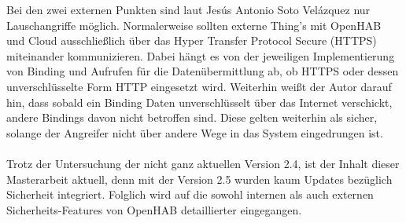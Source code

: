 Bei den zwei externen Punkten sind laut 
Jesús Antonio Soto Velázquez nur Lauschangriffe möglich. Normalerweise sollten externe Thing's mit OpenHAB und Cloud ausschließlich über das Hyper Transfer Protocol Secure (HTTPS) miteinander kommunizieren. Dabei hängt es von der jeweiligen Implementierung von Binding und Aufrufen für die Datenübermittlung ab, ob HTTPS oder dessen unverschlüsselte Form HTTP eingesetzt wird. Weiterhin weißt der Autor darauf hin, dass sobald ein Binding Daten unverschlüsselt über das Internet verschickt, andere Bindings davon nicht betroffen sind. Diese gelten weiterhin als sicher, solange der Angreifer nicht über andere Wege in das System eingedrungen ist.\\
\\
Trotz der Untersuchung der nicht ganz aktuellen Version 2.4, ist der Inhalt dieser Masterarbeit aktuell, denn mit der Version 2.5 wurden kaum Updates bezüglich Sicherheit integriert.\cite{OPENHAB02:OH} Folglich wird auf die sowohl internen als auch externen Sicherheits-Features von OpenHAB detaillierter eingegangen.


